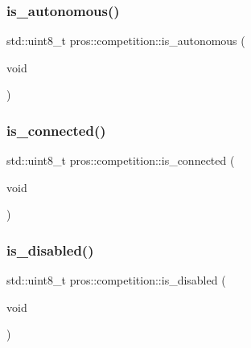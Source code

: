 \subsubsection{\texorpdfstring{is\+\_\+autonomous()}{is\_autonomous()}}
{\footnotesize\ttfamily std\+::uint8\+\_\+t pros\+::competition\+::is\+\_\+autonomous (\begin{DoxyParamCaption}\item[{void}]{ }\end{DoxyParamCaption})}

\mbox{\label{namespacepros_1_1competition_aaf36367a2369390657f6bc4285f68c64}} 
\subsubsection{\texorpdfstring{is\+\_\+connected()}{is\_connected()}}
{\footnotesize\ttfamily std\+::uint8\+\_\+t pros\+::competition\+::is\+\_\+connected (\begin{DoxyParamCaption}\item[{void}]{ }\end{DoxyParamCaption})}

\mbox{\label{namespacepros_1_1competition_a2d4f4555af4c45f7f82ea75e1223899b}} 
\subsubsection{\texorpdfstring{is\+\_\+disabled()}{is\_disabled()}}
{\footnotesize\ttfamily std\+::uint8\+\_\+t pros\+::competition\+::is\+\_\+disabled (\begin{DoxyParamCaption}\item[{void}]{ }\end{DoxyParamCaption})}

